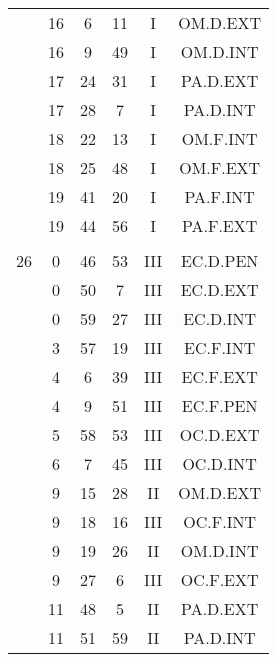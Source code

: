 \documentclass[12pt, a4paper]{article}
\begin{document}
\begin{multicols}{3}
{\begin{tabular}{c c c c c c}
	 	 	 	 & 16 & 6 & 11 & I & OM.D.EXT\\%
	 	 	 	 & 16 & 9 & 49 & I & OM.D.INT\\%
	 	 	 	 & 17 & 24 & 31 & I & PA.D.EXT\\%
	 	 	 	 & 17 & 28 & 7 & I & PA.D.INT\\%
	 	 	 	 & 18 & 22 & 13 & I & OM.F.INT\\%
	 	 	 	 & 18 & 25 & 48 & I & OM.F.EXT\\%
	 	 	 	 & 19 & 41 & 20 & I & PA.F.INT\\%
	 	 	 	 & 19 & 44 & 56 & I & PA.F.EXT\\%
	 	 	 	 & & & & & \\%
	 	 	 	26 & 0 & 46 & 53 & III & EC.D.PEN\\%
	 	 	 	 & 0 & 50 & 7 & III & EC.D.EXT\\%
	 	 	 	 & 0 & 59 & 27 & III & EC.D.INT\\%
	 	 	 	 & 3 & 57 & 19 & III & EC.F.INT\\%
	 	 	 	 & 4 & 6 & 39 & III & EC.F.EXT\\%
	 	 	 	 & 4 & 9 & 51 & III & EC.F.PEN\\%
	 	 	 	 & 5 & 58 & 53 & III & OC.D.EXT\\%
	 	 	 	 & 6 & 7 & 45 & III & OC.D.INT\\%
	 	 	 	 & 9 & 15 & 28 & II & OM.D.EXT\\%
	 	 	 	 & 9 & 18 & 16 & III & OC.F.INT\\%
	 	 	 	 & 9 & 19 & 26 & II & OM.D.INT\\%
	 	 	 	 & 9 & 27 & 6 & III & OC.F.EXT\\%
	 	 	 	 & 11 & 48 & 5 & II & PA.D.EXT\\%
	 	 	 	 & 11 & 51 & 59 & II & PA.D.INT\\%

\end{tabular}}
\end{multicols}
\end{document}
